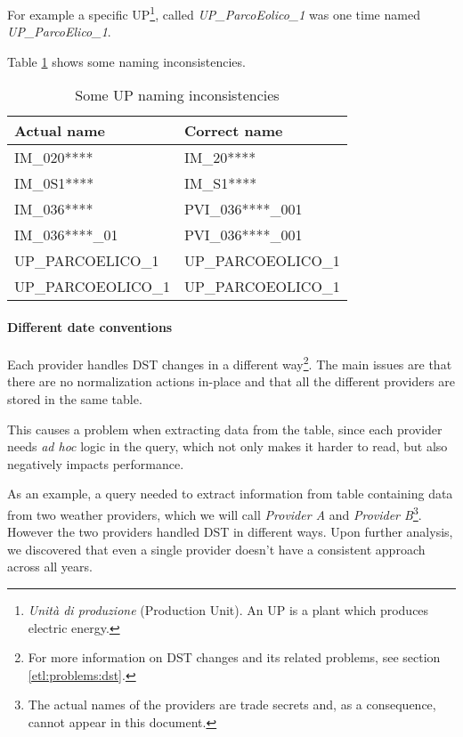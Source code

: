         For example a specific UP\footnote{\textit{Unità di produzione} (Production Unit). An UP is a plant which produces electric energy.}, called \textit{UP\_ParcoEolico\_1} was one time named \textit{UP\_ParcoElico\_1}.
        
        Table \ref{tab:sbil:up_names} shows some naming inconsistencies.
        
        \begin{table}
            \centering
            \begin{tabular}{|l|l|}
                \toprule
                Actual name         & Correct name      \\
                \midrule
                IM\_020****         & IM\_20****        \\
                IM\_0S1****         & IM\_S1****        \\
                \midrule
                IM\_036****         & PVI\_036****\_001 \\
                IM\_036****\_01     & PVI\_036****\_001 \\
                \midrule
                UP\_PARCOELICO\_1    & UP\_PARCOEOLICO\_1 \\
                UP\_PARCOEOLICO\_1   & UP\_PARCOEOLICO\_1 \\
                \bottomrule
            \end{tabular}
            \caption{Some UP naming inconsistencies}
            \label{tab:sbil:up_names}
        \end{table}

    \paragraph{Different date conventions}
        Each provider handles DST changes in a different way\footnote{For more information on DST changes and its related problems, see section \ref{etl:problems:dst}.}.
        The main issues are that there are no normalization actions in-place and that all the different providers are stored in the same table.
        
        This causes a problem when extracting data from the table, since each provider needs \textit{ad hoc} logic in the query, which not only makes it harder to read, but also negatively impacts performance.
        
        As an example, a query needed to extract information from table containing data from two weather providers, which we will call \textit{Provider A} and \textit{Provider B}\footnote{The actual names of the providers are trade secrets and, as a consequence, cannot appear in this document.}.
        However the two providers handled DST in different ways.
        Upon further analysis, we discovered that even a single provider doesn't have a consistent approach across all years.
        
